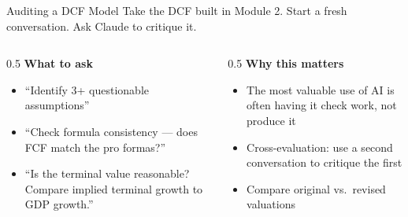 \documentclass[aspectratio=169]{beamer}
\begin{document}
\begin{frame}{Auditing a DCF Model}
Take the DCF built in Module 2. Start a fresh conversation. Ask Claude to \alert{critique} it.
\vspace{0.3cm}
\begin{columns}[T]
\begin{column}{0.5\textwidth}
\textbf{What to ask}
\begin{itemize}\small
  \item ``Identify 3+ questionable assumptions''
  \item ``Check formula consistency --- does FCF match the pro formas?''
  \item ``Is the terminal value reasonable? Compare implied terminal growth to GDP growth.''
\end{itemize}
\end{column}
\begin{column}{0.5\textwidth}
\textbf{Why this matters}
\begin{itemize}\small
  \item The most valuable use of AI is often having it \alert{check} work, not produce it
  \item Cross-evaluation: use a second conversation to critique the first
  \item Compare original vs.\ revised valuations
\end{itemize}
\end{column}
\end{columns}
\end{frame}
\end{document}
